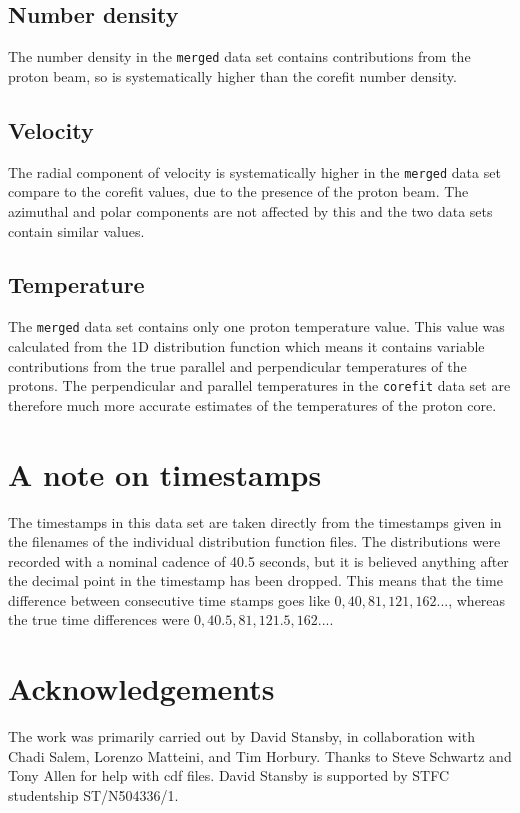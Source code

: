 \documentclass[11pt,a4paper]{article}
\begin{document}
\subsection{Number density}
The number density in the \texttt{merged} data set contains contributions from the proton beam, so is systematically higher than the corefit number density.
\subsection{Velocity}
The radial component of velocity is systematically higher in the \texttt{merged} data set compare to the corefit values, due to the presence of the proton beam. The azimuthal and polar components are not affected by this and the two data sets contain similar values.
\subsection{Temperature}
The \texttt{merged} data set contains only one proton temperature value. This value was calculated from the 1D distribution function which means it contains variable contributions from the true parallel and perpendicular temperatures of the protons. The perpendicular and parallel temperatures in the \texttt{corefit} data set are therefore much more accurate estimates of the temperatures of the proton core.

\section{A note on timestamps}
The timestamps in this data set are taken directly from the timestamps given in the filenames of the individual distribution function files. The distributions were recorded with a nominal cadence of 40.5 seconds, but it is believed anything after the decimal point in the timestamp has been dropped. This means that the time difference between consecutive time stamps goes like $0, 40, 81, 121, 162...$, whereas the true time differences were $0, 40.5, 81, 121.5, 162...$.
\appendix
\section{Acknowledgements}
The work was primarily carried out by David Stansby, in collaboration with Chadi Salem, Lorenzo Matteini, and Tim Horbury. Thanks to Steve Schwartz and Tony Allen for help with cdf files. David Stansby is supported by STFC studentship ST/N504336/1.
\end{document}
